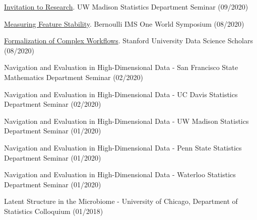 \documentclass[letterpaper]{article}
\renewenvironment{itemize}{
  \begin{list}{}{
    \setlength{\leftmargin}{1.5em}
  }
}{
  \end{list}
}
\begin{document}
\begin{itemize}
  \item \href{https://drive.google.com/file/d/1xwYyGc1bx7W-F5QyQlB3OJZT7MVTpdYd/view?usp=sharing}{Invitation to Research}. UW Madison Statistics Department Seminar (09/2020)
  \item \href{https://www.youtube.com/watch?v=0W84gxCm83A}{Measuring Feature Stability}. Bernoulli IMS One World Symposium (08/2020)
  \item \href{https://drive.google.com/file/d/1mSRbA96aTuiIHSUmgfZKV788seF3X7p_/view?usp=sharing}{Formalization of Complex Workflows}. Stanford University Data Science Scholars (08/2020)
  \item Navigation and Evaluation in High-Dimensional Data - San Francisco State Mathematics Department Seminar (02/2020)
  \item Navigation and Evaluation in High-Dimensional Data - UC Davis Statistics Department Seminar (02/2020)
  \item Navigation and Evaluation in High-Dimensional Data - UW Madison Statistics Department Seminar (01/2020)
  \item Navigation and Evaluation in High-Dimensional Data - Penn State Statistics Department Seminar (01/2020)
  \item Navigation and Evaluation in High-Dimensional Data - Waterloo Statistics Department Seminar (01/2020)
  \item Latent Structure in the Microbiome - University of Chicago, Department of Statistics Colloquium (01/2018)
\end{itemize}
\end{document}
